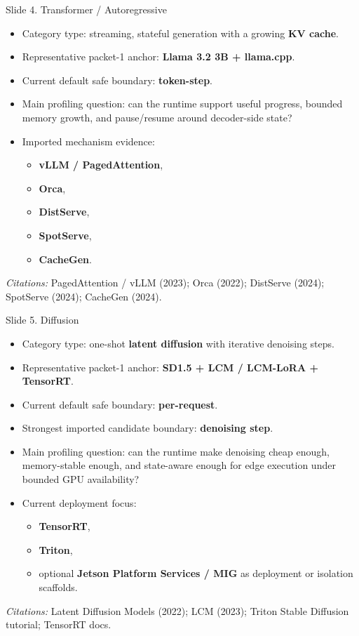\documentclass[aspectratio=169]{beamer}
\newcommand{\slidecite}[1]{\vspace{0.35em}\par{\tiny\raggedright\textit{Citations: }#1\par}}
\begin{document}
\begin{frame}[t]{Slide 4. Transformer / Autoregressive}
\small
\begin{itemize}
  \item Category type: streaming, stateful generation with a growing \textbf{KV cache}.
  \item Representative packet-1 anchor: \textbf{Llama 3.2 3B + llama.cpp}.
  \item Current default safe boundary: \textbf{token-step}.
  \item Main profiling question: can the runtime support useful progress, bounded memory growth, and pause/resume around decoder-side state?
  \item Imported mechanism evidence:
  \begin{itemize}
    \item \textbf{vLLM / PagedAttention},
    \item \textbf{Orca},
    \item \textbf{DistServe},
    \item \textbf{SpotServe},
    \item \textbf{CacheGen}.
  \end{itemize}
\end{itemize}
\slidecite{PagedAttention / vLLM (2023); Orca (2022); DistServe (2024); SpotServe (2024); CacheGen (2024).}
\end{frame}

\begin{frame}[t]{Slide 5. Diffusion}
\small
\begin{itemize}
  \item Category type: one-shot \textbf{latent diffusion} with iterative denoising steps.
  \item Representative packet-1 anchor: \textbf{SD1.5 + LCM / LCM-LoRA + TensorRT}.
  \item Current default safe boundary: \textbf{per-request}.
  \item Strongest imported candidate boundary: \textbf{denoising step}.
  \item Main profiling question: can the runtime make denoising cheap enough, memory-stable enough, and state-aware enough for edge execution under bounded GPU availability?
  \item Current deployment focus:
  \begin{itemize}
    \item \textbf{TensorRT},
    \item \textbf{Triton},
    \item optional \textbf{Jetson Platform Services / MIG} as deployment or isolation scaffolds.
  \end{itemize}
\end{itemize}
\slidecite{Latent Diffusion Models (2022); LCM (2023); Triton Stable Diffusion tutorial; TensorRT docs.}
\end{frame}
\end{document}
